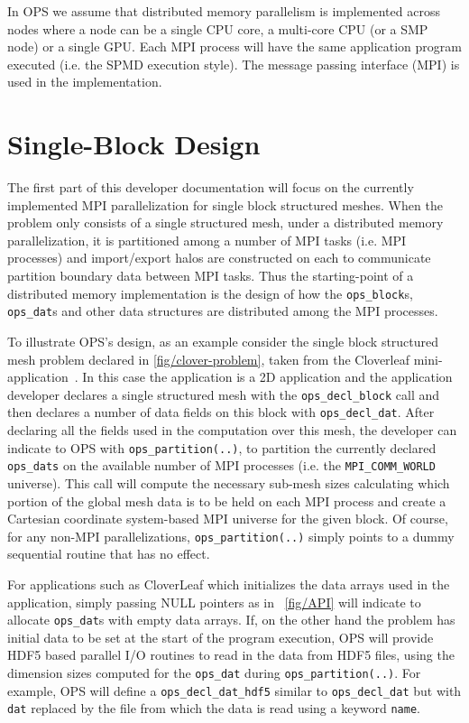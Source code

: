 \documentclass[11pt]{article}
\begin{document}
In OPS we assume that distributed memory parallelism is implemented across nodes where a node can be a single CPU core,
a multi-core CPU (or a SMP node) or a single GPU. Each MPI process will have the same application program executed (i.e.
the SPMD execution style). The message passing interface (MPI) is used in the implementation.

\section{Single-Block Design}

The first part of this developer documentation will focus on the currently implemented MPI parallelization for single
block structured meshes. When the problem only consists of a single structured mesh, under a distributed memory
parallelization, it is partitioned among a number of MPI tasks (i.e. MPI processes) and import/export halos are
constructed on each to communicate partition boundary data between MPI tasks. Thus the starting-point of a distributed
memory implementation is the design of how the \texttt{ops\_block}s, \texttt{ops\_dat}s and other data structures are
distributed among the MPI processes.

To illustrate OPS's design, as an example consider the single block structured mesh problem declared in \figurename{
\ref{fig/clover-problem}}, taken from the Cloverleaf mini-application~\cite{ops-cloverleaf}. In this case the
application is a 2D application and the application developer declares a single structured mesh with the
\texttt{ops\_decl\_block} call and then declares a number of data fields on this block with \texttt{ops\_decl\_dat}.
After declaring all the fields used in the computation over this mesh, the developer can indicate to OPS with
\texttt{ops\_partition(..)}, to partition the currently declared \texttt{ops\_dats} on the available number of MPI
processes (i.e. the \texttt{MPI\_COMM\_WORLD} universe). This call will compute the necessary sub-mesh sizes calculating
which portion of the global mesh data is to be held on each MPI process and create a Cartesian coordinate system-based
MPI universe for the given block. Of course, for any non-MPI parallelizations, \texttt{ops\_partition(..)} simply points
to a dummy sequential routine that has no effect.


For applications such as CloverLeaf which initializes the data arrays used in the application, simply passing NULL
pointers as in \figurename{~\ref{fig/API}} will indicate to allocate \texttt{ops\_dat}s with empty data arrays. If, on
the other hand the problem has initial data to be set at the start of the program execution, OPS will provide HDF5 based
parallel I/O routines to read in the data from HDF5 files, using the dimension sizes computed for the \texttt{ops\_dat}
during \texttt{ops\_partition(..)}. For example, OPS will define a \texttt{ops\_decl\_dat\_hdf5} similar to
\texttt{ops\_decl\_dat} but with \texttt{dat} replaced by the file from which the data is read using a keyword
\texttt{name}. \\
\end{document}
